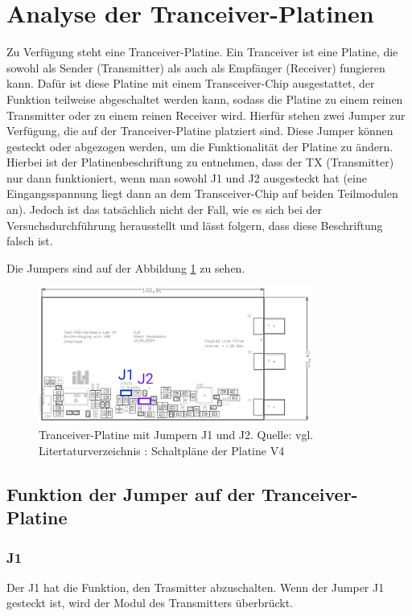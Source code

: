 \section{Analyse der Tranceiver-Platinen}
Zu Verfügung steht eine Tranceiver-Platine. Ein Tranceiver ist eine Platine, die sowohl als Sender (Transmitter) als auch als Empfänger (Receiver) fungieren kann. Dafür ist diese Platine mit einem Transceiver-Chip ausgestattet, der Funktion teilweise abgeschaltet werden kann, sodass die Platine zu einem reinen Transmitter oder zu einem reinen Receiver wird.  
Hierfür stehen zwei Jumper zur Verfügung, die auf der Tranceiver-Platine platziert sind. Diese Jumper können gesteckt oder abgezogen werden, um die Funktionalität der Platine zu ändern. Hierbei ist der Platinenbeschriftung zu entnehmen, dass der TX (Transmitter) nur dann funktioniert, wenn man sowohl J1 und J2 ausgesteckt hat (eine Eingangsspannung liegt dann an dem Transceiver-Chip auf beiden Teilmodulen an). Jedoch ist das tatsächlich nicht der Fall,
wie es sich bei der Versuchsdurchführung herausstellt und lässt folgern, dass diese Beschriftung falsch ist.

Die Jumpers sind auf der Abbildung \ref{fig:Tranceiver-Platine} zu sehen.
\begin{figure}[H]
    \centering
    \includegraphics[width=0.8\textwidth]{Pictures/Jumper.jpg}
    \caption{Tranceiver-Platine mit Jumpern J1 und J2. Quelle: vgl. Litertaturverzeichnis \cite{SchaltplanPCBV4}: Schaltpläne der Platine V4}
    \label{fig:Tranceiver-Platine}
\end{figure}
\subsection{Funktion der Jumper auf der Tranceiver-Platine}
\subsubsection{J1}
Der J1 hat die Funktion, den Trasmitter abzuschalten. Wenn der Jumper J1 gesteckt ist, wird der Modul des Transmitters überbrückt.
